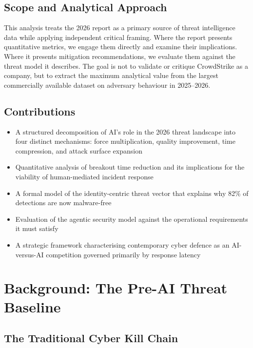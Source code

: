 \documentclass[journal]{IEEEtran}
\begin{document}
\subsection{Scope and Analytical Approach}

This analysis treats the 2026 report as a primary source of threat intelligence data
while applying independent critical framing. Where the report presents quantitative
metrics, we engage them directly and examine their implications. Where it presents
mitigation recommendations, we evaluate them against the threat model it describes.
The goal is not to validate or critique CrowdStrike as a company, but to extract
the maximum analytical value from the largest commercially available dataset on
adversary behaviour in 2025--2026.

\subsection{Contributions}

\begin{itemize}
  \item A structured decomposition of AI's role in the 2026 threat landscape into
        four distinct mechanisms: force multiplication, quality improvement, time
        compression, and attack surface expansion
  \item Quantitative analysis of breakout time reduction and its implications for
        the viability of human-mediated incident response
  \item A formal model of the identity-centric threat vector that explains why
        82\% of detections are now malware-free
  \item Evaluation of the agentic security model against the operational requirements
        it must satisfy
  \item A strategic framework characterising contemporary cyber defence as an
        AI-versus-AI competition governed primarily by response latency
\end{itemize}

\section{Background: The Pre-AI Threat Baseline}

\subsection{The Traditional Cyber Kill Chain}
\end{document}
